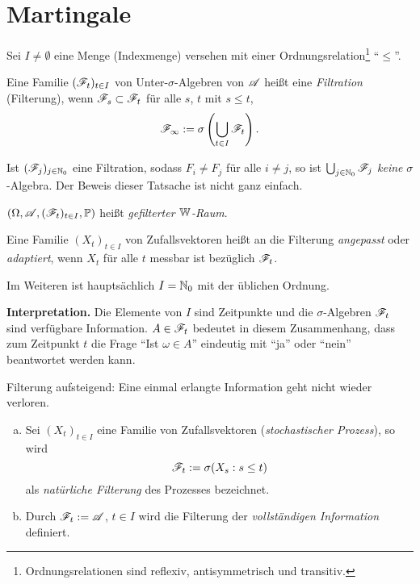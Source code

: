 \section{Martingale}
\begin{defn}
  Sei $I \ne \emptyset$ eine Menge (Indexmenge) versehen mit einer
  Ordnungsrelation\footnote{%
    Ordnungsrelationen sind reflexiv, antisymmetrisch und transitiv.}
  ``$\le$''.

  Eine Familie $(\mathscr{F}_t)_{t \in I}$ von Unter-$\sigma$-Algebren von $\mathscr{A}$ heißt
  eine \emph{Filtration} (Filterung), wenn $\mathscr{F}_s \subset \mathscr{F}_t$ für alle $s$,
  $t$ mit $s \le t$,
  \[ \mathscr{F}_\infty := \sigma \left( \bigcup_{t \in I} \mathscr{F}_t \right). \]

  \begin{rmrk*}
    Ist $(\mathscr{F}_j)_{j \in \mathbb{N}_0}$ eine Filtration, sodass $F_i \ne F_j$ für alle $i
    \ne j$, so ist $\bigcup_{j \in \mathbb{N}_0} \mathscr{F}_j$ \emph{keine} $\sigma$-Algebra.
    Der Beweis dieser Tatsache ist nicht ganz einfach.
  \end{rmrk*}

  $(\Omega, \mathscr{A}, (\mathscr{F}_t)_{t \in I}, \mathbb{P})$ heißt \emph{gefilterter $\mathbb{W}$-Raum}.

  Eine Familie $(X_t)_{t \in I}$ von Zufallsvektoren heißt an die Filterung
  \emph{angepasst} oder \emph{adaptiert}, wenn $X_t$ für alle $t$ messbar ist
  bezüglich $\mathscr{F}_t$.
\end{defn}

Im Weiteren ist hauptsächlich $I = \mathbb{N}_0$ mit der üblichen Ordnung.

\textbf{Interpretation.}
Die Elemente von $I$ sind Zeitpunkte und die $\sigma$-Algebren $\mathscr{F}_t$ sind
verfügbare Information. $A \in \mathscr{F}_t$ bedeutet in diesem Zusammenhang, dass zum
Zeitpunkt $t$ die Frage ``Ist $\omega \in A$'' eindeutig mit ``ja'' oder
``nein'' beantwortet werden kann.

Filterung aufsteigend: Eine einmal erlangte Information geht nicht wieder
verloren.

\begin{exmp}
  \begin{enumerate}[a)]
  \item Sei $(X_t)_{t \in I}$ eine Familie von Zufallsvektoren
    (\emph{stochastischer Prozess}), so wird
    \[ \mathscr{F}_t := \sigma( X_s : s \le t ) \]
    als \emph{natürliche Filterung} des Prozesses bezeichnet.
  \item Durch $\mathscr{F}_t := \mathscr{A}$, $t \in I$ wird die Filterung der
    \emph{vollständigen Information} definiert.
  \end{enumerate}
\end{exmp}

